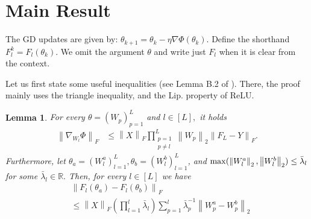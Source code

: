 \documentclass{article}
\def\RR{\mathbb{R}}
\newtheorem{lemma}[theorem]{Lemma}
\newcommand{\norm}[1]{\left\|#1\right\|}
\def\max{\mathop{\rm max}\nolimits}
\begin{document}
\section{Main Result}\label{sec:main}
The GD updates are given by: $\theta_{k+1} = \theta_k - \eta \nabla\Phi(\theta_k)$.
Define the shorthand $F_l^k=F_l(\theta_k).$
We omit the argument $\theta$ and write just $F_l$ when it is clear from the context.

Let us first state some useful inequalities (see Lemma B.2 of \cite{QuynhMarco2020}).
There, the proof mainly uses the triangle inequality, and the Lip. property of ReLU.
\begin{lemma}\label{lem:merged}
    For every $\theta=(W_p)_{p=1}^L$ and $l\in[L],$ it holds
    \begin{align}
	\norm{\nabla_{W_l}\Phi}_F 
	&\leq\norm{X}_F\prod_{\substack{p=1\\p\neq l}}^L\norm{W_p}_2 \norm{F_L-Y}_F.\label{eq:grad_norm}
    \end{align}      
   Furthermore, let $\theta_a=(W_l^a)_{l=1}^L, \theta_b=(W_l^b)_{l=1}^L$, 
   and  $\max(\norm{W_l^a}_2, \norm{W_l^b}_2)\leq \bar{\lambda}_l$ for some $\bar{\lambda}_l\in\RR.$ 
   Then, for every $l\in[L]$ we have
    \begin{align}
	&\norm{F_l(\theta_a)-F_l(\theta_b)}_F\nonumber\\
	&\leq \norm{X}_F \left(\prod_{l=1}^{l} \bar{\lambda}_l\right) \sum_{p=1}^l \bar{\lambda}_p^{-1} \norm{W_p^a-W_p^b}_2 \label{eq:Lip_Fl}
    \end{align}
\end{lemma}
\end{document}

